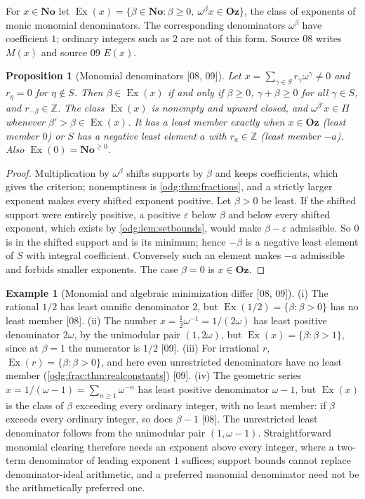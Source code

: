 \documentclass[11pt,oneside]{article}
\numberwithin{equation}{section}
\newtheorem{proposition}[proposition]{Proposition}
\theoremstyle{definition}
\newtheorem{example}[example]{Example}
\theoremstyle{remark}
\newcommand{\No}{\mathbf{No}}
\newcommand{\Oz}{\mathbf{Oz}}
\newcommand{\Z}{\mathbb Z}
\newcommand{\src}[1]{\textup{\textsf{\small[#1]}}}
\newcommand{\Ex}{\operatorname{Ex}}
\begin{document}
For $x\in\No$ let $\Ex(x)=\{\beta\in\No:\beta\ge0,\ \omega^\beta x\in\Oz\}$, the
class of exponents of monic monomial denominators. The corresponding
denominators $\omega^\beta$ have coefficient $1$; ordinary integers such as
$2$ are not of this form. Source 08 writes $M(x)$
and source 09 $E(x)$.

\begin{proposition}[Monomial denominators \src{08, 09}]\label{odg:frac:prop:monomial}
Let $x=\sum_{\gamma\in S}r_\gamma\omega^\gamma\ne0$ and $r_\eta=0$ for
$\eta\notin S$. Then $\beta\in\Ex(x)$ if and only if $\beta\ge0$,
$\gamma+\beta\ge0$ for all $\gamma\in S$, and $r_{-\beta}\in\Z$. The class
$\Ex(x)$ is nonempty and upward closed, and $\omega^{\beta'}x\in\Pi$ whenever
$\beta'>\beta\in\Ex(x)$. It has a least member exactly when $x\in\Oz$ (least
member $0$) or $S$ has a negative least element $a$ with $r_a\in\Z$ (least
member $-a$). Also $\Ex(0)=\No^{\ge0}$.
\end{proposition}
\begin{proof}
Multiplication by $\omega^\beta$ shifts supports by $\beta$ and keeps
coefficients, which gives the criterion; nonemptiness is \cref{odg:thm:fractions},
and a strictly larger exponent makes every shifted exponent positive. Let
$\beta>0$ be least. If the shifted support were entirely positive, a positive
$\varepsilon$ below $\beta$ and below every shifted exponent, which exists by
\cref{odg:lem:setbounds}, would make $\beta-\varepsilon$ admissible. So $0$ is
in the shifted support and is its minimum; hence $-\beta$ is a negative least
element of $S$ with integral coefficient. Conversely such an element makes $-a$
admissible and forbids smaller exponents. The case $\beta=0$ is $x\in\Oz$.
\end{proof}

\begin{example}[Monomial and algebraic minimization differ \src{08, 09}]\label{odg:frac:ex:monomial}
(i) The rational $1/2$ has least omnific denominator $2$, but
$\Ex(1/2)=\{\beta:\beta>0\}$ has no least member \src{08}. (ii) The number
$x=\tfrac12\omega^{-1}=1/(2\omega)$ has least positive denominator $2\omega$, by
the unimodular pair $(1,2\omega)$, but $\Ex(x)=\{\beta:\beta>1\}$, since at
$\beta=1$ the numerator is $1/2$ \src{09}. (iii) For irrational $r$,
$\Ex(r)=\{\beta:\beta>0\}$, and here even unrestricted denominators have no least
member (\cref{odg:frac:thm:realconstants}) \src{09}. (iv) The geometric series
$x=1/(\omega-1)=\sum_{n\ge1}\omega^{-n}$ has least positive denominator
$\omega-1$, but $\Ex(x)$ is the class of $\beta$ exceeding every ordinary integer,
with no least member: if $\beta$ exceeds every ordinary integer, so does
$\beta-1$ \src{08}. The unrestricted least denominator follows from the
unimodular pair $(1,\omega-1)$. Straightforward monomial clearing therefore needs
an exponent above every integer, where a two-term denominator of leading exponent
$1$ suffices; support bounds cannot replace denominator-ideal arithmetic, and a
preferred monomial denominator need not be the arithmetically preferred one.
\end{example}
\end{document}
